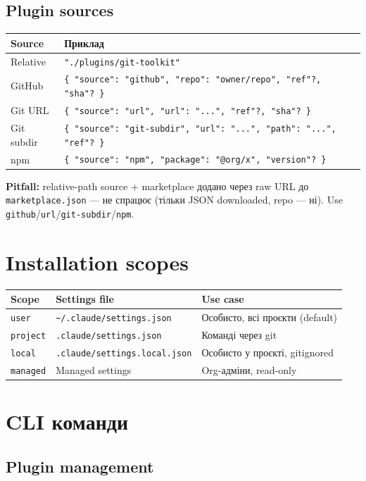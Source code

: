 \documentclass[11pt,a4paper]{article}
\begin{document}
\subsection{Plugin sources}

\begin{tabular}{ll}
\hline
\textbf{Source} & \textbf{Приклад} \\
\hline
Relative & \texttt{"./plugins/git-toolkit"} \\
GitHub & \texttt{\{ "source": "github", "repo": "owner/repo", "ref"?, "sha"? \}} \\
Git URL & \texttt{\{ "source": "url", "url": "...", "ref"?, "sha"? \}} \\
Git subdir & \texttt{\{ "source": "git-subdir", "url": "...", "path": "...", "ref"? \}} \\
npm & \texttt{\{ "source": "npm", "package": "@org/x", "version"? \}} \\
\hline
\end{tabular}

\textbf{Pitfall:} relative-path source + marketplace додано через raw URL до \texttt{marketplace.json} --- не спрацює (тільки JSON downloaded, repo --- ні). Use \texttt{github}/\texttt{url}/\texttt{git-subdir}/\texttt{npm}.

\section{Installation scopes}

\begin{tabular}{lll}
\hline
\textbf{Scope} & \textbf{Settings file} & \textbf{Use case} \\
\hline
\texttt{user} & \texttt{\textasciitilde/.claude/settings.json} & Особисто, всі проєкти (default) \\
\texttt{project} & \texttt{.claude/settings.json} & Команді через git \\
\texttt{local} & \texttt{.claude/settings.local.json} & Особисто у проєкті, gitignored \\
\texttt{managed} & Managed settings & Org-адміни, read-only \\
\hline
\end{tabular}

\section{CLI команди}

\subsection{Plugin management}
\end{document}
